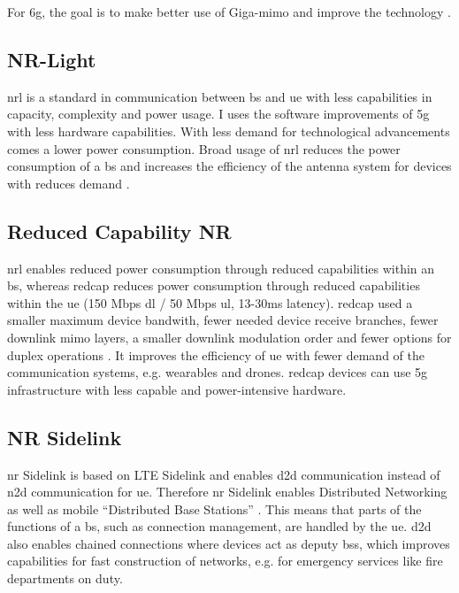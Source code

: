 \documentclass[11pt,a4paper]{article}
\begin{document}
For \acrshort{6g}, the goal is to make better use of Giga-\acrshort{mimo} and improve the technology \citep{3gpp17}.

\subsection{NR-Light}\label{subsec:nrlight}
\acrfull{nrl} is a standard in communication between \acrshort{bs} and \acrshort{ue} with less capabilities in capacity, complexity and power usage.
I uses the software improvements of \acrshort{5g} with less hardware capabilities.
With less demand for technological advancements comes a lower power consumption.
Broad usage of \acrshort{nrl} reduces the power consumption of a \acrlong{bs} and increases the efficiency of the antenna system for devices with reduces demand \citep{3gpp17}.

\subsection{Reduced Capability NR}\label{subsec:RedCap}
\acrshort{nrl} enables reduced power consumption through reduced capabilities within an \acrshort{bs}, whereas \acrfull{redcap} reduces power consumption through reduced capabilities within the \acrshort{ue} (150 Mbps \acrshort{dl} / 50 Mbps \acrshort{ul}, 13-30ms latency).
\acrshort{redcap} used a smaller maximum device bandwith, fewer needed device receive branches, fewer downlink \acrshort{mimo} layers, a smaller downlink modulation order and fewer options for duplex operations \citep{3gpp17}.
It improves the efficiency of \acrshort{ue} with fewer demand of the communication systems, e.g. wearables and drones.
\acrshort{redcap} devices can use \acrshort{5g} infrastructure with less capable and power-intensive hardware. 

\subsection{NR Sidelink}\label{subsec:sidelink}
\acrshort{nr} Sidelink is based on LTE Sidelink and enables \acrfull{d2d} communication instead of \acrfull{n2d} communication for \acrshort{ue}.
Therefore \acrshort{nr} Sidelink enables Distributed Networking as well as mobile \enquote{Distributed Base Stations} \citep{3gpp17}.
This means that parts of the functions of a \acrshort{bs}, such as connection management, are handled by the \acrshort{ue}.
\acrlong{d2d} also enables chained connections where devices act as deputy \acrlong{bs}s, which improves capabilities for fast construction of networks, e.g. for emergency services like fire departments on duty.
\end{document}
